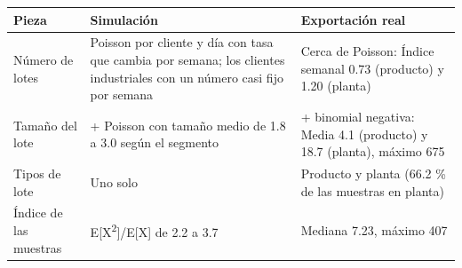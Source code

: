 \begin{tabular}{l>{\raggedright\arraybackslash}p{5.5cm}>{\raggedright\arraybackslash}p{5.5cm}}
\toprule
Pieza & Simulación & Exportación real \\
\midrule
Número de lotes & Poisson por cliente y día con tasa que cambia por semana; los clientes industriales con un número casi fijo por semana & Cerca de Poisson: Índice semanal 0.73 (producto) y 1.20 (planta) \\
Tamaño del lote & 1 + Poisson con tamaño medio de 1.8 a 3.0 según el segmento & 1 + binomial negativa: Media 4.1 (producto) y 18.7 (planta), máximo 675 \\
Tipos de lote & Uno solo & Producto y planta (66.2 \% de las muestras en planta) \\
Índice de las muestras & E[X\textsuperscript{2}]/E[X] de 2.2 a 3.7 & Mediana 7.23, máximo 407 \\
\bottomrule
\end{tabular}
